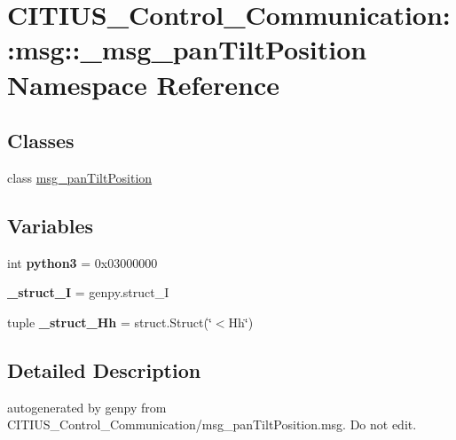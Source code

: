 \hypertarget{namespace_c_i_t_i_u_s___control___communication_1_1msg_1_1__msg__pan_tilt_position}{\section{\-C\-I\-T\-I\-U\-S\-\_\-\-Control\-\_\-\-Communication\-:\-:msg\-:\-:\-\_\-msg\-\_\-pan\-Tilt\-Position \-Namespace \-Reference}
\label{namespace_c_i_t_i_u_s___control___communication_1_1msg_1_1__msg__pan_tilt_position}
}
\subsection*{\-Classes}
\begin{DoxyCompactItemize}
\item 
class \hyperlink{class_c_i_t_i_u_s___control___communication_1_1msg_1_1__msg__pan_tilt_position_1_1msg__pan_tilt_position}{msg\-\_\-pan\-Tilt\-Position}
\end{DoxyCompactItemize}
\subsection*{\-Variables}
\begin{DoxyCompactItemize}
\item 
\hypertarget{namespace_c_i_t_i_u_s___control___communication_1_1msg_1_1__msg__pan_tilt_position_aa5c99c51fad2834aa9d73ccd9ed83ba9}{int {\bfseries python3} = 0x03000000}\label{namespace_c_i_t_i_u_s___control___communication_1_1msg_1_1__msg__pan_tilt_position_aa5c99c51fad2834aa9d73ccd9ed83ba9}

\item 
\hypertarget{namespace_c_i_t_i_u_s___control___communication_1_1msg_1_1__msg__pan_tilt_position_a8bf9a6a183be02a416a34980375e77a6}{{\bfseries \-\_\-struct\-\_\-\-I} = genpy.\-struct\-\_\-\-I}\label{namespace_c_i_t_i_u_s___control___communication_1_1msg_1_1__msg__pan_tilt_position_a8bf9a6a183be02a416a34980375e77a6}

\item 
\hypertarget{namespace_c_i_t_i_u_s___control___communication_1_1msg_1_1__msg__pan_tilt_position_ae745ad30b6dfd8ad0bd360ffeda03f17}{tuple {\bfseries \-\_\-struct\-\_\-\-Hh} = struct.\-Struct(\char`\"{}$<$\-Hh\char`\"{})}\label{namespace_c_i_t_i_u_s___control___communication_1_1msg_1_1__msg__pan_tilt_position_ae745ad30b6dfd8ad0bd360ffeda03f17}

\end{DoxyCompactItemize}


\subsection{\-Detailed \-Description}
\begin{DoxyVerb}autogenerated by genpy from CITIUS_Control_Communication/msg_panTiltPosition.msg. Do not edit.\end{DoxyVerb}
 